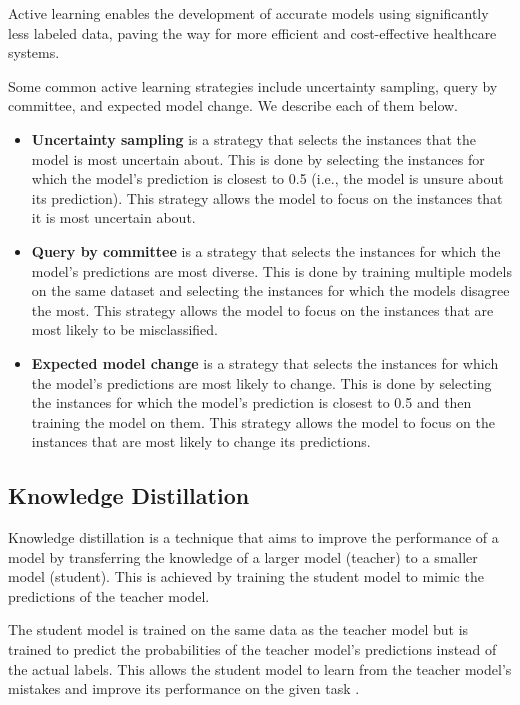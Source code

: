 \documentclass[../main.tex]{subfiles}
\begin{document}
     Active learning enables the development of accurate models using significantly less labeled data, paving the way for more efficient and cost-effective healthcare systems. 
     
     Some common active learning strategies include uncertainty sampling, query by committee, and expected model change. We describe each of them below.

     \begin{itemize}
        \item \textbf{Uncertainty sampling} is a strategy that selects the instances that the model is most uncertain about. This is done by selecting the instances for which the model's prediction is closest to 0.5 (i.e., the model is unsure about its prediction). This strategy allows the model to focus on the instances that it is most uncertain about.
        \item  \textbf{Query by committee} is a strategy that selects the instances for which the model's predictions are most diverse. This is done by training multiple models on the same dataset and selecting the instances for which the models disagree the most. This strategy allows the model to focus on the instances that are most likely to be misclassified.
        \item \textbf{Expected model change} is a strategy that selects the instances for which the model's predictions are most likely to change. This is done by selecting the instances for which the model's prediction is closest to 0.5 and then training the model on them. This strategy allows the model to focus on the instances that are most likely to change its predictions.
     \end{itemize}

     \clearpage

     \subsection{Knowledge Distillation} \label{sec:knowledge_distillation} 

    Knowledge distillation is a technique that aims to improve the performance of a model by transferring the knowledge of a larger model (teacher) to a smaller model (student). This is achieved by training the student model to mimic the predictions of the teacher model. 
    
    The student model is trained on the same data as the teacher model but is trained to predict the probabilities of the teacher model's predictions instead of the actual labels. This allows the student model to learn from the teacher model's mistakes and improve its performance on the given task \cite{hinton_distilling_2015}.
\end{document}
